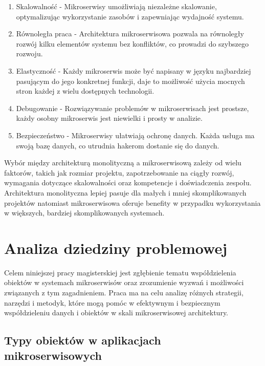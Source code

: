 \documentclass[runningheads,12pt]{llncs}
\begin{document}
\begin{enumerate}
    \item Skalowalność - Mikroserwisy umożliwiają niezależne skalowanie, optymalizując wykorzystanie zasobów i zapewniając wydajność systemu.
    \item Równoległa praca - Architektura mikroserwisowa pozwala na równoległy rozwój kilku elementów systemu bez konfliktów, co prowadzi do szybszego rozwoju.
    \item Elastyczność - Każdy mikroserwis może być napisany w języku najbardziej pasującym do jego konkretnej funkcji, daje to możliwość użycia mocnych stron każdej z wielu dostępnych technologii.
    \item Debugowanie - Rozwiązywanie problemów w mikroserwisach jest prostsze, każdy osobny mikroserwis jest niewielki i prosty w analizie.
    \item Bezpieczeństwo - Mikroserwisy ułatwiają ochronę danych. Każda usługa ma swoją bazę danych, co utrudnia hakerom dostanie się do danych.~\cite{sharma2023monolithic}
\end{enumerate}

Wybór między architekturą monolityczną a mikroserwisową zależy od wielu faktorów, takich jak rozmiar projektu, zapotrzebowanie na ciągły rozwój, wymagania dotyczące skalowalności oraz kompetencje i doświadczenia zespołu. Architektura monolityczna lepiej pasuje dla małych i mniej skomplikowanych projektów natomiast mikroserwisowa oferuje benefity w przypadku wykorzystania w większych, bardziej skomplikowanych systemach. ~\cite[p. 11]{newman2015building}

\newpage

\section{Analiza dziedziny problemowej}

Celem niniejszej pracy magisterskiej jest zgłębienie tematu współdzielenia obiektów w systemach mikroserwisów oraz zrozumienie wyzwań i możliwości związanych z tym zagadnieniem. Praca ma na celu analizę różnych strategii, narzędzi i metodyk, które mogą pomóc w efektywnym i bezpiecznym współdzieleniu danych i obiektów w skali mikroserwisowej architektury.

\subsection{Typy obiektów w aplikacjach mikroserwisowych}
\end{document}
